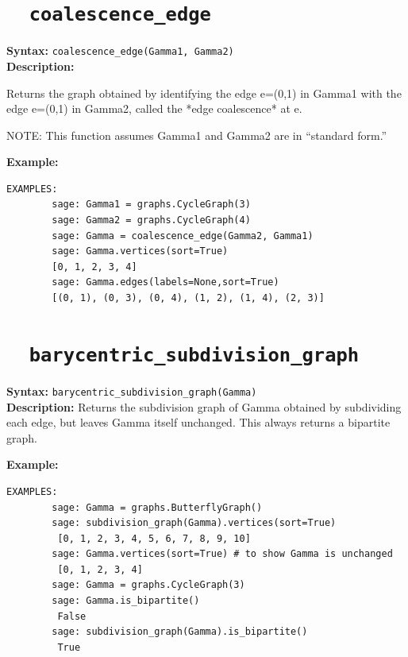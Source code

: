 \documentclass{article}
\begin{document}
\section{\tt \ \ coalescence\_edge}

\textbf{Syntax:} \verb}coalescence_edge(Gamma1, Gamma2)}\\

\textbf{Description:}

Returns the graph obtained by identifying the edge e=(0,1) in Gamma1
with the edge e=(0,1) in Gamma2, called the 
*edge coalescence* at e.

NOTE: This function assumes Gamma1 and Gamma2 are in ``standard form.''

\textbf{Example:}
\begin{verbatim}
EXAMPLES:
        sage: Gamma1 = graphs.CycleGraph(3)                                                       
        sage: Gamma2 = graphs.CycleGraph(4)                                                       
        sage: Gamma = coalescence_edge(Gamma2, Gamma1)                                       
        sage: Gamma.vertices(sort=True)
        [0, 1, 2, 3, 4]
        sage: Gamma.edges(labels=None,sort=True)                                                            
        [(0, 1), (0, 3), (0, 4), (1, 2), (1, 4), (2, 3)]
\end{verbatim}

\section{\tt \ \ barycentric\_subdivision\_graph}

\textbf{Syntax:} \verb}barycentric_subdivision_graph(Gamma)}\\

\textbf{Description:}
Returns the subdivision graph of Gamma obtained by subdividing each edge, 
but leaves Gamma itself unchanged. This always returns a bipartite graph.

\textbf{Example:}
\begin{verbatim}
EXAMPLES:
        sage: Gamma = graphs.ButterflyGraph()            
        sage: subdivision_graph(Gamma).vertices(sort=True)              
         [0, 1, 2, 3, 4, 5, 6, 7, 8, 9, 10]
        sage: Gamma.vertices(sort=True) # to show Gamma is unchanged    
         [0, 1, 2, 3, 4]
        sage: Gamma = graphs.CycleGraph(3)
        sage: Gamma.is_bipartite()
         False
        sage: subdivision_graph(Gamma).is_bipartite()
         True
\end{verbatim}
\end{document}
